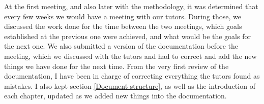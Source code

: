 At the first meeting, and also later with the methodology, it was determined that every few weeks we would have a meeting with our tutors. During those, we discussed the work done for the time between the two meetings, which goals established at the previous one were achieved, and what would be the goals for the next one. We also submitted a version of the documentation before the meeting, which we discussed with the tutors and had to correct and add the new things we have done for the next time. From the very first review of the documentation, I have been in charge of correcting everything the tutors found as mistakes. I also kept section \ref{Document structure}, as well as the introduction of each chapter, updated as we added new things into the documentation.
